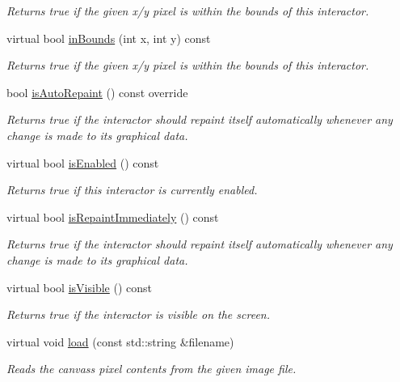 \begin{DoxyCompactItemize}
\begin{DoxyCompactList}\small\item\em Returns true if the given x/y pixel is within the bounds of this interactor. \end{DoxyCompactList}\item 
virtual bool \mbox{\hyperlink{classGInteractor_ae6d7982c1c627b677a5e776ca86118ed}{in\+Bounds}} (int x, int y) const
\begin{DoxyCompactList}\small\item\em Returns true if the given x/y pixel is within the bounds of this interactor. \end{DoxyCompactList}\item 
bool \mbox{\hyperlink{classGCanvas_a189881032e2b355095790b83b2454d8d}{is\+Auto\+Repaint}} () const override
\begin{DoxyCompactList}\small\item\em Returns true if the interactor should repaint itself automatically whenever any change is made to its graphical data. \end{DoxyCompactList}\item 
virtual bool \mbox{\hyperlink{classGInteractor_aacb819fb241851fd9fc045271baa4034}{is\+Enabled}} () const
\begin{DoxyCompactList}\small\item\em Returns true if this interactor is currently enabled. \end{DoxyCompactList}\item 
virtual bool \mbox{\hyperlink{classGDrawingSurface_a82a00267c81cc0ae85ee0feb01a92fa8}{is\+Repaint\+Immediately}} () const
\begin{DoxyCompactList}\small\item\em Returns true if the interactor should repaint itself automatically whenever any change is made to its graphical data. \end{DoxyCompactList}\item 
virtual bool \mbox{\hyperlink{classGInteractor_a9d8a6cfb13917785c143e74d40e4e2be}{is\+Visible}} () const
\begin{DoxyCompactList}\small\item\em Returns true if the interactor is visible on the screen. \end{DoxyCompactList}\item 
virtual void \mbox{\hyperlink{classGCanvas_a6c21edd9d285c925527e3209fca54b01}{load}} (const std\+::string \&filename)
\begin{DoxyCompactList}\small\item\em Reads the canvas\textquotesingle{}s pixel contents from the given image file. \end{DoxyCompactList}\item 

\end{DoxyCompactItemize}

